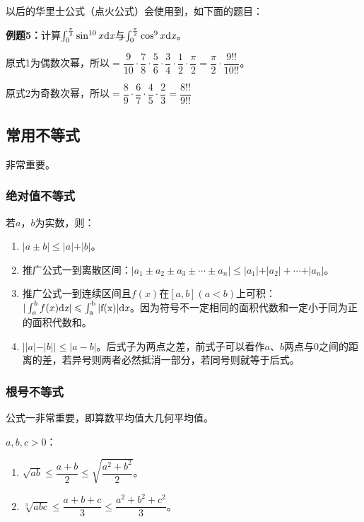 \documentclass[UTF8, 12pt]{ctexart}
\begin{document}
以后的华里士公式（点火公式）会使用到，如下面的题目：

\textbf{例题5：}计算$\int_0^{\frac{\pi}{2}}\sin^{10}x\rm{d}\textit{x}$与$\int_0^{\frac{\pi}{2}}\cos^9x\rm{d}\textit{x}$。\medskip

原式1为偶数次幂，所以$=\dfrac{9}{10}\cdot\dfrac{7}{8}\cdot\dfrac{5}{6}\cdot\dfrac{3}{4}\cdot\dfrac{1}{2}\cdot\dfrac{\pi}{2}=\dfrac{\pi}{2}\cdot\dfrac{9!!}{10!!}$。\medskip

原式2为奇数次幂，所以$=\dfrac{8}{9}\cdot\dfrac{6}{7}\cdot\dfrac{4}{5}\cdot\dfrac{2}{3}=\dfrac{8!!}{9!!}$

\subsection{常用不等式}

非常重要。

\subsubsection{绝对值不等式}

若$a$，$b$为实数，则：

\begin{enumerate}
    \item $\vert a\pm b\vert\leqslant\vert a\vert+\vert b\vert$。
    \item 推广公式一到离散区间：$\vert a_1\pm a_2\pm a_3\pm\cdots\pm a_n\vert\leqslant\vert a_1\vert+\vert a_2\vert+\cdots+\vert a_n\vert$。
    \item 推广公式一到连续区间且$f(x)$在$[a,b](a<b)$上可积：$\vert\int_a^bf(x)\rm{d}\textit{x}\vert\leqslant\int_a^b\vert f(x)\vert\rm{d}\textit{x}$。因为符号不一定相同的面积代数和一定小于同为正的面积代数和。
    \item $\vert\vert a\vert-\vert b\vert\vert\leqslant\vert a-b\vert$。后式子为两点之差，前式子可以看作$a$、$b$两点与0之间的距离的差，若异号则两者必然抵消一部分，若同号则就等于后式。
\end{enumerate}



\subsubsection{根号不等式}

公式一非常重要，即算数平均值大几何平均值。

$a,b,c>0$：

\begin{enumerate}
    \item $\sqrt{ab}\leqslant\dfrac{a+b}{2}\leqslant\sqrt{\dfrac{a^2+b^2}{2}}$。
    \item $\sqrt[3]{abc}\leqslant\dfrac{a+b+c}{3}\leqslant\dfrac{a^2+b^2+c^2}{3}$。
\end{enumerate}
\end{document}
